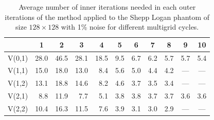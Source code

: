 \begin{table}[htp]
\caption{Average number of inner iterations needed in each outer iterations of the method applied to the Shepp Logan phantom of size $128 \times 128$ with 1\% noise for different multigrid cycles.}
\begin{center}
\begin{tabular}{|l|r|r|r|r|r|r|r|r|r|r|}
\hline
& \multicolumn{1}{c|}{1} & \multicolumn{1}{c|}{2} & \multicolumn{1}{c|}{3} & \multicolumn{1}{c|}{4} & \multicolumn{1}{c|}{5} & \multicolumn{1}{c|}{6} & \multicolumn{1}{c|}{7} & \multicolumn{1}{c|}{8} & \multicolumn{1}{c|}{9} & \multicolumn{1}{c|}{10} \\
\hline
V(0,1) & 28.0 & 46.5 & 28.1 & 18.5 & 9.5 & 6.7 & 6.2 & 5.7 & 5.7 & 5.4 \\
V(1,1) & 15.0 & 18.0 & 13.0 & 8.4 & 5.6 & 5.0 & 4.4 & 4.2 & \multicolumn{1}{c|}{---} & \multicolumn{1}{c|}{---}\\
V(1,2) & 13.1 & 18.8 & 14.6 & 8.2 & 4.6 & 3.7 & 3.5 & 3.4 & \multicolumn{1}{c|}{---} & \multicolumn{1}{c|}{---} \\
V(2,1) & 8.8 & 11.9 & 7.7 & 5.1 & 3.8 & 3.8 & 3.7 & 3.7 & 3.6 & 3.6 \\
V(2,2) & 10.4 &16.3 & 11.5 & 7.6 & 3.9 & 3.1 & 3.0 & 2.9 & \multicolumn{1}{c|}{---} & \multicolumn{1}{c|}{---} \\
\hline
\end{tabular}
\end{center}
\label{tab:its_cycling}
\end{table}%

